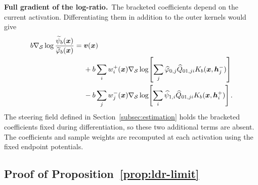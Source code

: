 \noindent\textbf{Full gradient of the log-ratio.}~The bracketed coefficients depend on the current activation. Differentiating them in addition to the outer kernels would give
\label{apx:omitted-term}
\begin{equation}
\begin{aligned}
b\nabla_{\mathcal{S}}\log\frac{\widetilde{\psi}_b(\boldsymbol{x})}{\widetilde{\varphi}_b(\boldsymbol{x})}
={}&\boldsymbol{v}(\boldsymbol{x})\\
&+b\sum_i w_i^+(\boldsymbol{x})\nabla_{\mathcal{S}}\log\!\left[\sum_j\widehat{\varphi}_{0,j}\widehat{Q}_{01,ji}K_b(\boldsymbol{x},\boldsymbol{h}_j^-)\right]\\
&-b\sum_j w_j^-(\boldsymbol{x})\nabla_{\mathcal{S}}\log\!\left[\sum_i\widehat{\psi}_{1,i}\widehat{Q}_{01,ji}K_b(\boldsymbol{x},\boldsymbol{h}_i^+)\right].
\end{aligned}
\label{eq:apx-omitted}
\end{equation}
The steering field defined in Section~\ref{subsec:estimation} holds the bracketed coefficients fixed during differentiation, so these two additional terms are absent. The coefficients and sample weights are recomputed at each activation using the fixed endpoint potentials.

\subsection{Proof of Proposition~\ref{prop:ldr-limit}}
\label{apx:proof-ldr-limit}

